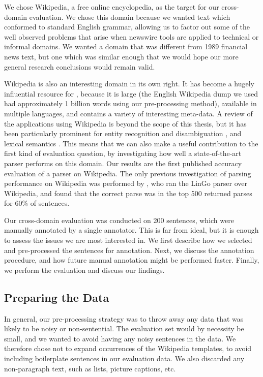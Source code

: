 We chose Wikipedia, a free online encyclopedia, as the target for our
cross-domain evaluation. We chose this domain because we wanted text which
conformed to standard English grammar, allowing us to factor out some of the
well observed problems that arise when newswire tools are applied to technical
or informal domains. We wanted a domain that was different from 1989 financial
news text, but one which was similar enough that we would hope our more general
research conclusions would remain valid.

Wikipedia is also an interesting domain in its own right. It has become a hugely
influential resource for \nlp, because it is large (the English Wikipedia dump
we used had approximately 1 billion words using our pre-processing method),
available in multiple languages, and contains a variety of interesting
meta-data. A review of the \nlp applications using Wikipedia is beyond the scope
of this thesis, but it has been particularly prominent for entity recognition
\citep{nothman:09} and disambiguation \citep{bunescu:06}, and lexical semantics
\citep{strube:06}. This means that we can also make a useful contribution to the
first kind of evaluation question, by investigating how well a state-of-the-art
parser performs on this domain. Our results are the first published accuracy
evaluation of a parser on Wikipedia. The only previous investigation of parsing
performance on Wikipedia was performed by \citep{ytrestol:09}, who ran the LinGo
\hpsg parser \citep{oepen:04} over Wikipedia, and found that the correct parse
was in the top 500 returned parses for 60\% of sentences.

Our cross-domain evaluation was conducted on 200 sentences, which were manually
annotated by a single annotator. This is far from ideal, but it is enough to
assess the issues we are most interested in. We first describe how we selected
and pre-processed the sentences for annotation. Next, we discuss the annotation
procedure, and how future \ccg manual annotation might be performed faster.
Finally, we perform the evaluation and discuss our findings.

\subsection{Preparing the Data}
\label{sec:wiki_preprocessing}

In general, our pre-processing strategy was to throw away any data that was
likely to be noisy or non-sentential. The evaluation set would by necessity be
small, and we wanted to avoid having any noisy sentences in the data. We
therefore chose not to expand occurrences of the Wikipedia templates, to avoid
including boilerplate sentences in our evaluation data. We also discarded any
non-paragraph text, such as lists, picture captions, etc.

